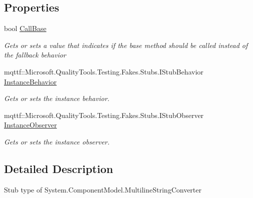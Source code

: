\subsection*{Properties}
\begin{DoxyCompactItemize}
\item 
bool \hyperlink{class_system_1_1_component_model_1_1_fakes_1_1_stub_multiline_string_converter_a80c687456390e207a87d63ea36aff6c4}{Call\-Base}
\begin{DoxyCompactList}\small\item\em Gets or sets a value that indicates if the base method should be called instead of the fallback behavior\end{DoxyCompactList}\item 
mqttf\-::\-Microsoft.\-Quality\-Tools.\-Testing.\-Fakes.\-Stubs.\-I\-Stub\-Behavior \hyperlink{class_system_1_1_component_model_1_1_fakes_1_1_stub_multiline_string_converter_af766735dc4e62d2a7a530ed2921647aa}{Instance\-Behavior}
\begin{DoxyCompactList}\small\item\em Gets or sets the instance behavior.\end{DoxyCompactList}\item 
mqttf\-::\-Microsoft.\-Quality\-Tools.\-Testing.\-Fakes.\-Stubs.\-I\-Stub\-Observer \hyperlink{class_system_1_1_component_model_1_1_fakes_1_1_stub_multiline_string_converter_ac5dac3d28482e70bb51b9eb904cc1ee4}{Instance\-Observer}
\begin{DoxyCompactList}\small\item\em Gets or sets the instance observer.\end{DoxyCompactList}\end{DoxyCompactItemize}


\subsection{Detailed Description}
Stub type of System.\-Component\-Model.\-Multiline\-String\-Converter



